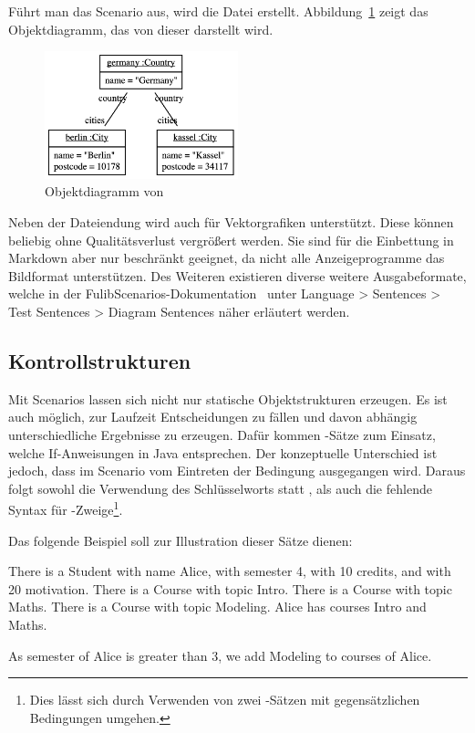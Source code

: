 Führt man das Scenario aus, wird die Datei  erstellt.
Abbildung~\ref{fig:germany.png} zeigt das Objektdiagramm, das von dieser darstellt wird.

\begin{figure}
    \centering
    \includegraphics[width=0.5\textwidth]{chapter/fulib-scenarios/img/germany.png}
    \caption{Objektdiagramm von }
    \label{fig:germany.png}
\end{figure}

Neben der Dateiendung  wird auch  für Vektorgrafiken unterstützt.
Diese können beliebig ohne Qualitätsverlust vergrößert werden.
Sie sind für die Einbettung in Markdown aber nur beschränkt geeignet, da nicht alle Anzeigeprogramme das Bildformat unterstützen.
Des Weiteren existieren diverse weitere Ausgabeformate, welche in der FulibScenarios-Dokumentation~\cite{documentation} unter Language > Sentences > Test Sentences > Diagram Sentences näher erläutert werden.

\subsection{Kontrollstrukturen}\label{subsec:control-structures}

Mit Scenarios lassen sich nicht nur statische Objektstrukturen erzeugen.
Es ist auch möglich, zur Laufzeit Entscheidungen zu fällen und davon abhängig unterschiedliche Ergebnisse zu erzeugen.
Dafür kommen -Sätze zum Einsatz, welche If-Anweisungen in Java entsprechen.
Der konzeptuelle Unterschied ist jedoch, dass im Scenario vom Eintreten der Bedingung ausgegangen wird.
Daraus folgt sowohl die Verwendung des Schlüsselworts  statt , als auch die fehlende Syntax für -Zweige\footnote{
Dies lässt sich durch Verwenden von zwei -Sätzen mit gegensätzlichen Bedingungen umgehen.
}.

Das folgende Beispiel soll zur Illustration dieser Sätze dienen:

\begin{codeblock}
    There is a Student with name Alice, with semester 4, with 10 credits, and with 20 motivation.
    There is a Course with topic Intro.
    There is a Course with topic Maths.
    There is a Course with topic Modeling.
    Alice has courses Intro and Maths.

    As semester of Alice is greater than 3, we add Modeling to courses of Alice.
\end{codeblock}

